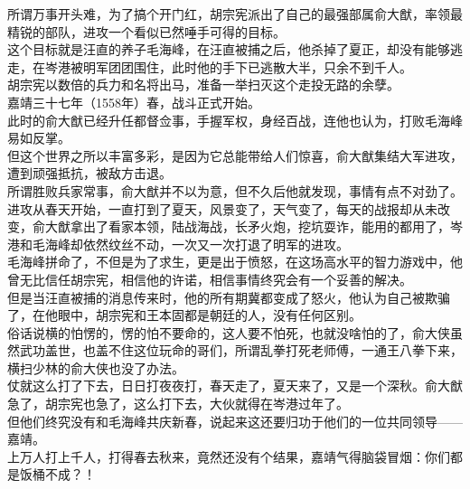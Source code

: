 \begin{multicols}{\theparacolNo}
所谓万事开头难，为了搞个开门红，胡宗宪派出了自己的最强部属俞大猷，率领最精锐的部队，进攻一个看似已然唾手可得的目标。\\

这个目标就是汪直的养子毛海峰，在汪直被捕之后，他杀掉了夏正，却没有能够逃走，在岑港被明军团团围住，此时他的手下已逃散大半，只余不到千人。\\

胡宗宪以数倍的兵力和名将出马，准备一举扫灭这个走投无路的余孽。\\

嘉靖三十七年（1558年）春，战斗正式开始。\\

此时的俞大猷已经升任都督佥事，手握军权，身经百战，连他也认为，打败毛海峰易如反掌。\\

但这个世界之所以丰富多彩，是因为它总能带给人们惊喜，俞大猷集结大军进攻，遭到顽强抵抗，被敌方击退。\\

所谓胜败兵家常事，俞大猷并不以为意，但不久后他就发现，事情有点不对劲了。\\

进攻从春天开始，一直打到了夏天，风景变了，天气变了，每天的战报却从未改变，俞大猷拿出了看家本领，陆战海战，长矛火炮，挖坑耍诈，能用的都用了，岑港和毛海峰却依然纹丝不动，一次又一次打退了明军的进攻。\\

毛海峰拼命了，不但是为了求生，更是出于愤怒，在这场高水平的智力游戏中，他曾无比信任胡宗宪，相信他的许诺，相信事情终究会有一个妥善的解决。\\

但是当汪直被捕的消息传来时，他的所有期冀都变成了怒火，他认为自己被欺骗了，在他眼中，胡宗宪和王本固都是朝廷的人，没有任何区别。\\

俗话说横的怕愣的，愣的怕不要命的，这人要不怕死，也就没啥怕的了，俞大侠虽然武功盖世，也盖不住这位玩命的哥们，所谓乱拳打死老师傅，一通王八拳下来，横扫少林的俞大侠也没了办法。\\

仗就这么打了下去，日日打夜夜打，春天走了，夏天来了，又是一个深秋。俞大猷急了，胡宗宪也急了，这么打下去，大伙就得在岑港过年了。\\

但他们终究没有和毛海峰共庆新春，说起来这还要归功于他们的一位共同领导——嘉靖。\\

上万人打上千人，打得春去秋来，竟然还没有个结果，嘉靖气得脑袋冒烟：你们都是饭桶不成？！\\


\end{multicols}
